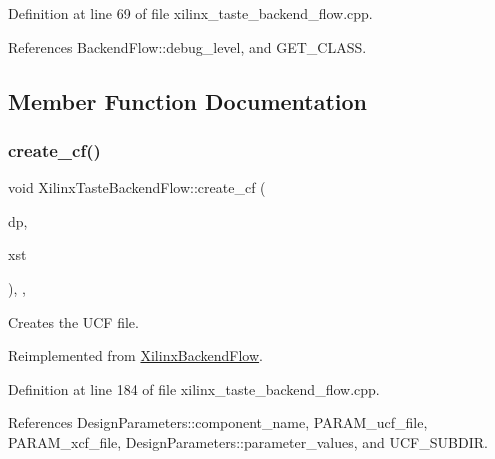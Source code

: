 Definition at line 69 of file xilinx\+\_\+taste\+\_\+backend\+\_\+flow.\+cpp.



References Backend\+Flow\+::debug\+\_\+level, and G\+E\+T\+\_\+\+C\+L\+A\+SS.



\subsection{Member Function Documentation}
\mbox{\label{classXilinxTasteBackendFlow_a0672740f515c4ef8cefe95feeca8dc12}} 
\subsubsection{\texorpdfstring{create\+\_\+cf()}{create\_cf()}}
{\footnotesize\ttfamily void Xilinx\+Taste\+Backend\+Flow\+::create\+\_\+cf (\begin{DoxyParamCaption}\item[{const \hyperlink{DesignParameters_8hpp_ae36bb1c4c9150d0eeecfe1f96f42d157}{Design\+Parameters\+Ref}}]{dp,  }\item[{bool}]{xst }\end{DoxyParamCaption})\hspace{0.3cm}{\ttfamily [override]}, {\ttfamily [protected]}, {\ttfamily [virtual]}}



Creates the U\+CF file. 



Reimplemented from \hyperlink{classXilinxBackendFlow_af8b92a68a04a001e2f4b43fd14dd21b7}{Xilinx\+Backend\+Flow}.



Definition at line 184 of file xilinx\+\_\+taste\+\_\+backend\+\_\+flow.\+cpp.



References Design\+Parameters\+::component\+\_\+name, P\+A\+R\+A\+M\+\_\+ucf\+\_\+file, P\+A\+R\+A\+M\+\_\+xcf\+\_\+file, Design\+Parameters\+::parameter\+\_\+values, and U\+C\+F\+\_\+\+S\+U\+B\+D\+IR.

\mbox{\label{classXilinxTasteBackendFlow_a8f8760e798f045aaad6cc3b56a00e627}} 
